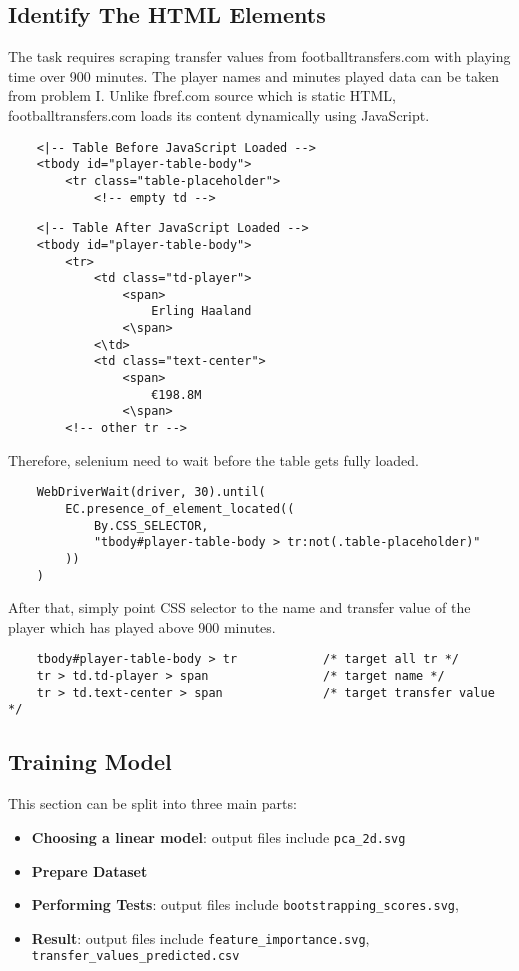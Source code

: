 \documentclass{report}
\begin{document}
\subsection{Identify The HTML Elements}
The task requires scraping transfer values from footballtransfers.com with playing time over 900 
minutes. The player names and minutes played data can be taken from problem I. Unlike fbref.com 
source which is static HTML, footballtransfers.com loads its content dynamically using JavaScript.
\begin{verbatim}
    <|-- Table Before JavaScript Loaded -->
    <tbody id="player-table-body">
        <tr class="table-placeholder">
            <!-- empty td -->
\end{verbatim}
\begin{verbatim}
    <|-- Table After JavaScript Loaded -->
    <tbody id="player-table-body">
        <tr>
            <td class="td-player">
                <span>
                    Erling Haaland
                <\span>
            <\td>
            <td class="text-center">
                <span>
                    €198.8M
                <\span>
        <!-- other tr -->
\end{verbatim}

Therefore, selenium need to wait before the table gets fully loaded.
\begin{verbatim}
    WebDriverWait(driver, 30).until(
        EC.presence_of_element_located((
            By.CSS_SELECTOR, 
            "tbody#player-table-body > tr:not(.table-placeholder)"
        ))
    )
\end{verbatim}

After that, simply point CSS selector to the name and transfer value of the player which has played
above 900 minutes.
\begin{verbatim}
    tbody#player-table-body > tr            /* target all tr */
    tr > td.td-player > span                /* target name */
    tr > td.text-center > span              /* target transfer value */ 
\end{verbatim}

\subsection{Training Model}
This section can be split into three main parts:
\begin{itemize}
    \item \textbf{Choosing a linear model}: output files include \verb|pca_2d.svg|
    \item \textbf{Prepare Dataset} 
    \item \textbf{Performing Tests}: output files include \verb|bootstrapping_scores.svg|,
    \item \textbf{Result}: output files include \verb|feature_importance.svg|, 
    \verb|transfer_values_predicted.csv|
\end{itemize}
\end{document}
